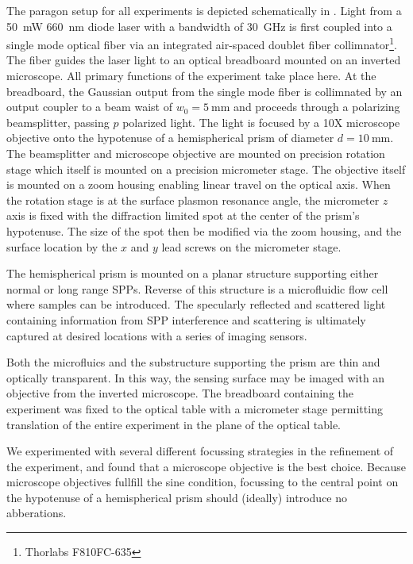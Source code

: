The paragon setup for all experiments is depicted
schematically in .  Light from a 
\SI{50}{\milli\watt} \SI{660}{\nano\meter} diode
laser with a bandwidth of \SI{30}{\giga\hertz} is first
coupled into a single mode optical fiber via an integrated air-spaced
doublet fiber collimnator\footnote{Thorlabs F810FC-635}.  The fiber guides
the laser light to an optical breadboard mounted on an inverted
microscope.  All primary functions of the experiment
take place here.  At the breadboard, the Gaussian output from the single
mode fiber is collimnated by an output coupler to a beam
waist of $w_0=\SI{5}{\milli\meter}$ and proceeds through a polarizing
beamsplitter, passing $p$ polarized light.  The
light is focused by a 10X microscope objective onto the hypotenuse of a
hemispherical prism of diameter $d=\SI{10}{\milli\meter}$.  The
beamsplitter and microscope objective are mounted on precision rotation
stage which itself is mounted on a precision micrometer stage.  The
objective itself is mounted on a zoom housing enabling linear travel on the
optical axis.  When the rotation stage is at the surface plasmon resonance
angle, the micrometer $z$ axis is fixed with the diffraction limited spot
at the center of the prism's hypotenuse.  The size of the spot then be
modified via the zoom housing, and the surface location by the $x$ and $y$
lead screws on the micrometer stage.  

The hemispherical prism is mounted on a planar structure supporting
either normal or long range SPPs.  Reverse of this structure is a
microfluidic flow cell where samples can be introduced.  The specularly
reflected and scattered light containing information from SPP interference
and scattering is ultimately captured at desired locations with a series of imaging
sensors.

Both the microfluics and the substructure supporting the prism are thin and
optically transparent.  In this way, the sensing surface may be imaged with
an objective from the inverted microscope.  The breadboard containing the
experiment was fixed to the optical table with a micrometer stage
permitting translation of the entire experiment in the plane of the optical
table.

We experimented with several different focussing strategies in the
refinement of the experiment, and found that a microscope objective is the
best choice.  Because microscope objectives fullfill the sine condition,
focussing to the central point on the hypotenuse of a hemispherical prism
should (ideally) introduce no abberations.

